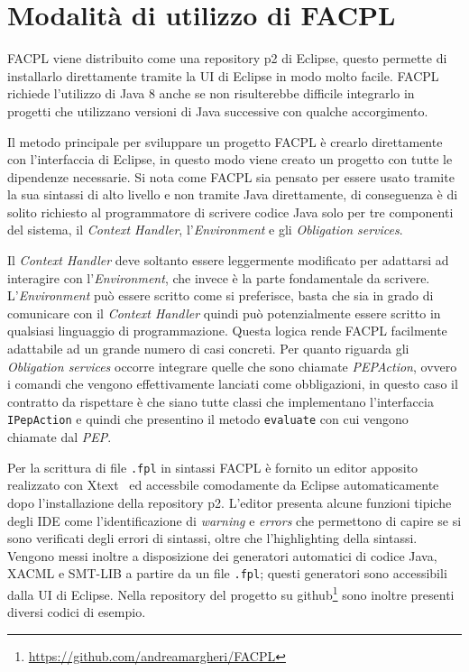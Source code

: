\section{Modalità di utilizzo di FACPL}
\label{sec:modalitaFACPL}
FACPL viene distribuito come una repository p2 di Eclipse, questo permette di installarlo direttamente tramite la UI di Eclipse in modo molto facile. FACPL richiede l'utilizzo di Java 8 anche se non risulterebbe difficile integrarlo in progetti che utilizzano versioni di Java successive con qualche accorgimento.\par
Il metodo principale per sviluppare un progetto FACPL è crearlo direttamente con l'interfaccia di Eclipse, in questo modo viene creato un progetto con tutte le dipendenze necessarie. Si nota come FACPL sia pensato per essere usato tramite la sua sintassi di alto livello e non tramite Java direttamente, di conseguenza è di solito richiesto al programmatore di scrivere codice Java solo per tre componenti del sistema, il \emph{Context Handler}, l'\emph{Environment} e gli \emph{Obligation services}.\par
Il \emph{Context Handler} deve soltanto essere leggermente modificato per adattarsi ad interagire con l'\emph{Environment}, che invece è la parte fondamentale da scrivere. L'\emph{Environment} può essere scritto come si preferisce, basta che sia in grado di comunicare con il \emph{Context Handler} quindi può potenzialmente essere scritto in qualsiasi linguaggio di programmazione. Questa logica rende FACPL facilmente adattabile ad un grande numero di casi concreti. Per quanto riguarda gli \emph{Obligation services} occorre integrare quelle che sono chiamate \emph{PEPAction}, ovvero i comandi che vengono effettivamente lanciati come obbligazioni, in questo caso il contratto da rispettare è che siano tutte classi che implementano l'interfaccia \texttt{IPepAction} e quindi che presentino il metodo \texttt{evaluate} con cui vengono chiamate dal \emph{PEP}.\par
Per la scrittura di file \texttt{.fpl} in sintassi FACPL è fornito un editor apposito realizzato con Xtext~\cite{eclipseXtext} ed accessbile comodamente da Eclipse automaticamente dopo l'installazione della repository p2. L'editor presenta alcune funzioni tipiche degli IDE come l'identificazione di \emph{warning} e \emph{errors} che permettono di capire se si sono verificati degli errori di sintassi, oltre che l'highlighting della sintassi. Vengono messi inoltre a disposizione dei generatori automatici di codice Java, XACML e SMT-LIB a partire da un file \texttt{.fpl}; questi generatori sono accessibili dalla UI di Eclipse. Nella repository del progetto su github\footnote{\url{https://github.com/andreamargheri/FACPL}} sono inoltre presenti diversi codici di esempio.\par

